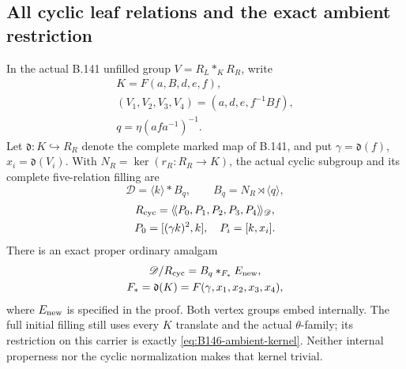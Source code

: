 \subsection*{All cyclic leaf relations and the exact ambient restriction}

\label{stmt:B146}
In the actual B.141 unfilled group $V=R_L*_KR_R$, write
\[
\begin{gathered}
 K=F(a,B,d,e,f), \\
 (V_1,V_2,V_3,V_4)=(a,d,e,f^{-1}Bf), \\
 q=\eta(afa^{-1})^{-1}.
\end{gathered}
\]
Let $\mathfrak d:K\hookrightarrow R_R$ denote the complete marked
map of B.141, and put $\gamma=\mathfrak d(f)$,
$x_i=\mathfrak d(V_i)$. With $N_R=\ker(r_R:R_R\to K)$, the
actual cyclic subgroup and its complete five-relation filling are
\begin{equation}\label{eq:B146-carrier}
 \mathscr D=\langle k\rangle*B_q,\qquad
 B_q=N_R\rtimes\langle q\rangle,
\end{equation}
\begin{equation}\label{eq:B146-five}
\begin{gathered}
 R_{\rm cyc}=\langle\!\langle P_0,P_1,P_2,P_3,P_4
                    \rangle\!\rangle_{\mathscr D},\\
 P_0=[(\gamma k)^2,k],\quad P_i=[k,x_i].
\end{gathered}
\end{equation}
There is an exact proper ordinary amalgam
\begin{equation}\label{eq:B146-amalgam}
\begin{gathered}
 \mathscr D/R_{\rm cyc}
       =B_q*_{F_*}E_{\rm new},\\
 F_*=\mathfrak d(K)=F(\gamma,x_1,x_2,x_3,x_4),
\end{gathered}
\end{equation}
where $E_{\rm new}$ is specified in the proof. Both vertex groups
embed internally. The full initial filling still uses every $K$
translate and the actual $\theta$-family; its restriction on this
carrier is exactly \eqref{eq:B146-ambient-kernel}. Neither internal
properness nor the cyclic normalization makes that kernel trivial.

